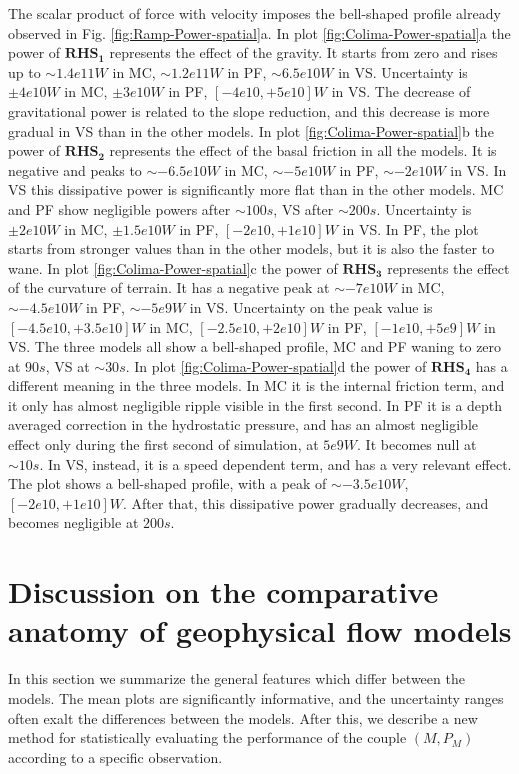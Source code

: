 \documentclass{article}
\begin{document}
The scalar product of force with velocity imposes the bell-shaped profile already observed in Fig. \ref{fig:Ramp-Power-spatial}a. In plot \ref{fig:Colima-Power-spatial}a the power of $\boldsymbol{RHS_1}$ represents the effect of the gravity. It starts from zero and rises up to $\sim 1.4e11 W$ in MC, $\sim 1.2e11 W$ in PF, $\sim 6.5e10 W$ in VS. Uncertainty is $\pm 4e10 W$ in MC, $\pm 3e10 W$ in PF, $[-4e10,+5e10] W$ in VS. The decrease of gravitational power is related to the slope reduction, and this decrease is more gradual in VS than in the other models. In plot \ref{fig:Colima-Power-spatial}b the power of  $\boldsymbol{RHS_2}$ represents the effect of the basal friction in all the models. It is negative and peaks to $\sim -6.5e10 W$ in MC, $\sim -5e10 W$ in PF, $\sim -2e10 W$ in VS. In VS this dissipative power is significantly more flat than in the other models. MC and PF show negligible powers after $\sim 100 s$, VS after $\sim 200 s$. Uncertainty is $\pm 2e10 W$ in MC, $\pm 1.5e10 W$ in PF, $[-2e10,+1e10] W$ in VS. In PF, the plot starts from stronger values than in the other models, but it is also the faster to wane. In plot \ref{fig:Colima-Power-spatial}c the power of $\boldsymbol{RHS_3}$ represents the effect of the curvature of terrain. It has a negative peak at $\sim -7e10 W$ in MC, $\sim -4.5e10 W$ in PF, $\sim -5e9 W$ in VS. Uncertainty on the peak value is $[-4.5e10,+3.5e10] W$ in MC, $[-2.5e10,+2e10] W$ in PF, $[-1e10,+5e9] W$ in VS. The three models all show a bell-shaped profile, MC and PF waning to zero at $90 s$, VS at $\sim 30 s$. In plot \ref{fig:Colima-Power-spatial}d the power of $\boldsymbol{RHS_4}$ has a different meaning in the three models. In MC it is the internal friction term, and it only has almost negligible ripple visible in the first second. In PF it is a depth averaged correction in the hydrostatic pressure, and has an almost negligible effect only during the first second of simulation, at $5e9 W$. It becomes null at $\sim 10 s$. In VS, instead, it is a speed dependent term, and has a very relevant effect. The plot shows a bell-shaped profile, with a peak of $\sim -3.5e10 W$, $[-2e10,+1e10] W$. After that, this dissipative power gradually decreases, and becomes negligible at $200 s$.

\section{Discussion on the comparative anatomy of geophysical flow models}
In this section we summarize the general features which differ between the models. The mean plots are significantly informative, and the uncertainty ranges often exalt the differences between the models. After this, we describe a new method for statistically evaluating the performance of the couple $\left(M, P_M\right)$ according to a specific observation.
\end{document}
